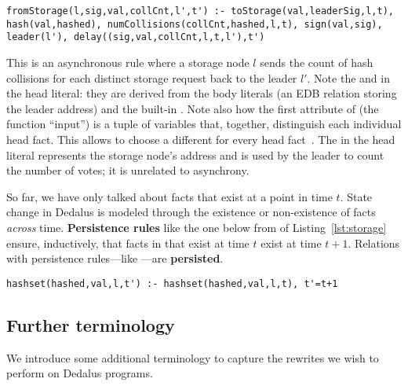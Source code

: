 \begin{lstlisting}[language=Dedalus, float=false, firstnumber=5]
fromStorage(l,sig,val,collCnt,l',t') :- toStorage(val,leaderSig,l,t), hash(val,hashed), numCollisions(collCnt,hashed,l,t), sign(val,sig), leader(l'), delay((sig,val,collCnt,l,t,l'),t')
\end{lstlisting}
This is an asynchronous rule where a storage node $l$ sends the count of hash collisions for each distinct storage request back to the leader $l'$.
Note the  and  in the head literal: they are derived from the body literals  (an EDB relation storing the leader address) and the built-in . 
Note also how the first attribute of  (the function ``input'') is a tuple of variables that, together, distinguish each individual head fact. This allows  to choose a different  for every head fact~\cite{dedalusSemantics}.
The  in the head literal represents the storage node's address and is used by the leader to count the number of votes; it is unrelated to asynchrony.



So far, we have only talked about facts that exist at a point in time $t$.
State change in Dedalus is modeled through the existence or non-existence of facts \emph{across} time.
\textbf{Persistence rules} like the one below from  of Listing~\ref{lst:storage} ensure, inductively, that facts in  that exist at time $t$ exist at time $t+1$.
Relations with persistence rules---like ---are \textbf{persisted}.
\begin{lstlisting}[language=Dedalus, float=false, firstnumber=2]
hashset(hashed,val,l,t') :- hashset(hashed,val,l,t), t'=t+1
\end{lstlisting}

\subsection{Further terminology}
\label{sec:further-terminology}

We introduce some additional terminology to capture 
the rewrites we wish to perform on Dedalus programs.

